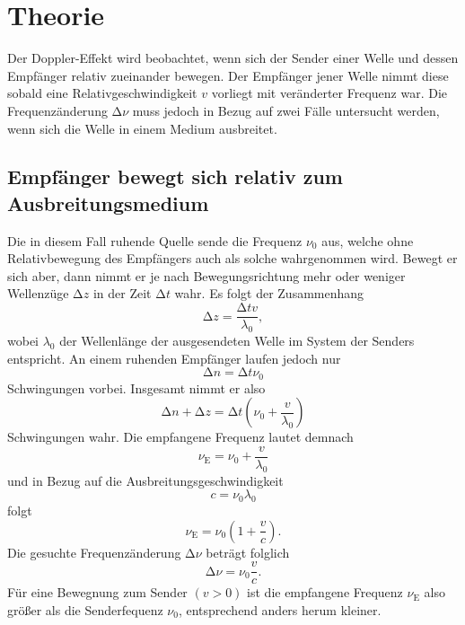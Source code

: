 \section{Theorie}
\label{sec:Theorie}
Der Doppler-Effekt wird beobachtet, wenn sich der Sender einer Welle und dessen Empfänger relativ zueinander bewegen.
Der Empfänger jener Welle nimmt diese sobald eine Relativgeschwindigkeit $v$ vorliegt mit veränderter Frequenz war.
Die Frequenzänderung $\increment \nu$ muss jedoch in Bezug auf zwei Fälle untersucht werden, wenn sich die Welle in einem Medium ausbreitet.\\
\subsection{Empfänger bewegt sich relativ zum Ausbreitungsmedium}
Die in diesem Fall ruhende Quelle sende die Frequenz $\nu_0$ aus, welche ohne Relativbewegung des Empfängers auch als solche wahrgenommen wird.
Bewegt er sich aber, dann nimmt er je nach Bewegungsrichtung mehr oder weniger Wellenzüge $\increment z$ in der Zeit $\increment t$ wahr.
Es folgt der Zusammenhang
\begin{equation}
  \increment z = \frac{\increment t v}{\lambda_0} \label{eqn:1},
\end{equation}
wobei $\lambda_0$ der Wellenlänge der ausgesendeten Welle im System der Senders entspricht.
An einem ruhenden Empfänger laufen jedoch nur
\begin{equation}
  \increment n = \increment t \nu_0 \label{eqn:2}
\end{equation}
Schwingungen vorbei.
Insgesamt nimmt er also
\begin{equation}
  \increment n + \increment z = \increment t \left( \nu_0 + \frac{v}{\lambda_0}\right) \label{eqn:3}
\end{equation}
Schwingungen wahr.
Die empfangene Frequenz lautet demnach
\begin{equation}
  \nu_{\text{E}} = \nu_0 + \frac{v}{\lambda_0} \label{eqn:4}
\end{equation}
und in Bezug auf die Ausbreitungsgeschwindigkeit
\begin{equation}
  c = \nu_0 \lambda_0
\end{equation}
folgt
\begin{equation}
  \nu_{\text{E}} = \nu_0 \left(1 + \frac{v}{c} \right). \label{eqn:5}
\end{equation}
Die gesuchte Frequenzänderung $\increment \nu$ beträgt folglich
\begin{equation}
  \increment \nu = \nu_0 \frac{v}{c}. \label{eqn:5}
\end{equation}
Für eine Bewegnung zum Sender $(v>0)$ ist die empfangene Frequenz $\nu_{\text{E}}$ also größer als die Senderfequenz $\nu_0$, entsprechend anders herum kleiner.
